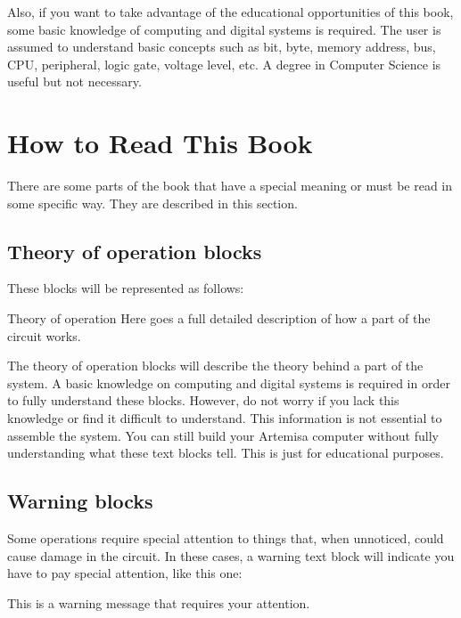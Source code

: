 Also, if you want to take advantage of the educational opportunities of this book, some basic knowledge of computing and digital systems is required. The user is assumed to understand basic concepts such as bit, byte, memory address, bus, CPU, peripheral, logic gate, voltage level, etc. A degree in Computer Science is useful but not necessary.

\section{How to Read This Book}

There are some parts of the book that have a special meaning or must be read in some specific way. They are described in this section. 

\subsection{Theory of operation blocks}

These blocks will be represented as follows:\\

\begin{theory}[h!]{Theory of operation}
	Here goes a full detailed description of how a part of the circuit works. 	
\end{theory}

The theory of operation blocks will describe the theory behind a part of the system. A basic knowledge on computing and digital systems is required in order to fully understand these blocks. However, do not worry if you lack this knowledge or find it difficult to understand. This information is not essential to assemble the system. You can still build your Artemisa computer without fully understanding what these text blocks tell. This is just for educational purposes.

\subsection{Warning blocks}

Some operations require special attention to things that, when unnoticed, could cause damage in the circuit. In these cases, a warning text block will indicate you have to pay special attention, like this one:\\

\begin{warning}
	This is a warning message that requires your attention.
\end{warning}

